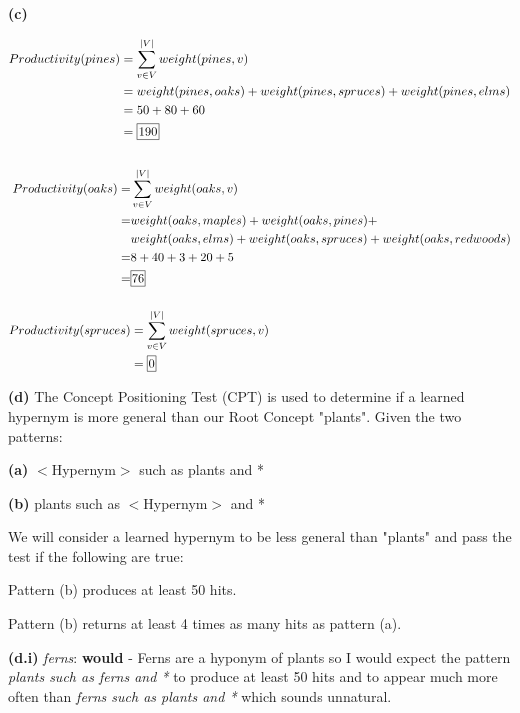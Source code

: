 \documentclass[11pt]{article}
\renewcommand\part[1]{\vspace{.10in}\textbf{(#1)}}
\begin{document}
\part{c} 

\begin{align*}
Productivity(pines) &= \sum_{v \in V}^{|V|} weight(pines, v) \\
&= weight(pines, oaks) + weight(pines, spruces) + weight(pines, elms) \\
&= 50 + 80 + 60 \\
&= \framebox[1.2\width]{190}	 \\ \\
\end{align*}
\begin{align*}
Productivity(oaks) = &\sum_{v \in V}^{|V|} weight(oaks, v) \\
= &weight(oaks, maples) + weight(oaks, pines) + \\ &weight(oaks, elms) + weight(oaks, spruces) + weight(oaks, redwoods) \\
= &8 + 40 + 3 + 20 + 5\\
= &\framebox[1.2\width]{76} \\ \\
Productivity(spruces) &= \sum_{v \in V}^{|V|} weight(spruces, v) \\
&= \framebox[1.5\width]{0}
\end{align*}

\part{d} The Concept Positioning Test (CPT) is used to determine if a learned hypernym is more general than our Root Concept "plants". Given the two patterns:
\vskip 0.2in
\centerline{\textbf{(a)} $<$Hypernym$>$ such as plants and *}
\vskip 0.1in
\centerline{\textbf{(b)} plants such as $<$Hypernym$>$ and *}
\vskip 0.2in
We will consider a learned hypernym to be less general than "plants" and pass the test if the following are true:

\vskip 0.2in
\centerline{Pattern (b) produces at least 50 hits.}
\vskip 0.1in
\centerline{Pattern (b) returns at least 4 times as many hits as pattern (a).}
\vskip 0.2in

\part{d.i} \textit{ferns}: \textbf{would} - Ferns are a hyponym of plants so I would expect the pattern \textit{plants such as ferns and *} to produce at least 50 hits and to appear much more often than \textit{ferns such as plants and *} which sounds unnatural.
\end{document}
